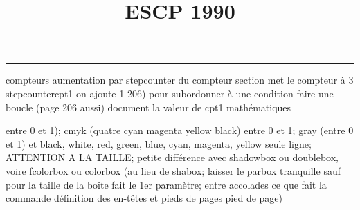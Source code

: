 \documentclass[11pt]{article}%
\title{\bf \vspace{-2cm} ESCP 1990} %
\author{} %
\date{} %
\renewcommand{\headrulewidth}{0pt}%
\renewcommand{\footrulewidth}{0.4pt}%
\begin{document}
\maketitle %
\vspace{-1.4cm}\hrule %
\thispagestyle{fancy}

\vspace*{.2cm}



compteurs%
aumentation par stepcounter du compteur section%
met le compteur à 3%
stepcounter{cpt1} on ajoute 1%
206) pour subordonner à une condition %
faire une boucle (page 206 aussi) %
document la valeur de cpt1 
mathématiques\newcommand{\ch}{\operatorname{ch}} 
\newcommand{\sh}{\operatorname{sh}}
\renewcommand{\tanh}{\operatorname{th}}
\renewcommand{\sinh}{\operatorname{sh}}
\renewcommand{\cosh}{\operatorname{ch}}
\newcommand{\argsh}{\operatorname{argsh}}
\newcommand{\argch}{\operatorname{argch}}
\newcommand{\argth}{\operatorname{argth}}
\newcommand{\ker}{\operatorname{Ker}}
\renewcommand{\im}{\operatorname{Im}}
\newcommand{\rg}{\operatorname{rg}}
\newcommand{\Id}{\operatorname{Id}}
\newcommand{\id}{\operatorname{id}}
\renewcommand{\leq}{\leq}
\renewcommand{\geq}{\geq }

entre 0 et 1); cmyk (quatre cyan magenta yellow black) entre 0 et 1;
gray (entre 0 et 1) et black, white, red, green, blue, cyan, magenta,
yellow%
seule ligne; ATTENTION A LA TAILLE; petite différence avec shadowbox ou
doublebox, voire fcolorbox ou colorbox (au lieu de shabox; laisser le
parbox tranquille sauf pour la taille de la boîte
\newcommand{\Tbox}[1]{\begin{center} \shabox{\parbox{0.6
\linewidth}{#1}} \end{center}} %
fait le 1er paramètre; entre accolades ce que fait la commande
définition des en-têtes et pieds de pages\pagestyle{fancy}
\chead{}
\rfoot[ \ \thepage]{\thepage}
\cfoot{}
\lfoot{}
\thispagestyle{fancy} %
pied de page)\renewcommand{\footrulewidth}{0.4pt}
\renewcommand{\headrulewidth}{0.4pt}
\end{document}
